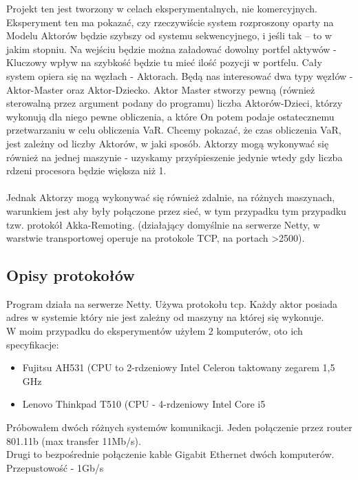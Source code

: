 \documentclass[11pt,titlepage]{article}
\begin{document}
Projekt ten jest tworzony w celach eksperymentalnych, nie komercyjnych. Eksperyment ten ma pokazać, czy rzeczywiście system rozproszony oparty na Modelu Aktorów będzie szybszy od systemu sekwencyjnego, i jeśli tak – to w jakim stopniu. Na wejściu będzie można załadować dowolny portfel aktywów - Kluczowy wpływ na szybkość będzie tu mieć ilość pozycji w portfelu. Cały system opiera się na węzłach - Aktorach. Będą nas interesować dwa typy węzłów - Aktor-Master oraz Aktor-Dziecko. Aktor Master stworzy pewną (również sterowalną przez argument podany do programu) liczba Aktorów-Dzieci, którzy wykonują dla niego pewne obliczenia, a które On potem podaje ostatecznemu przetwarzaniu w celu obliczenia VaR. Chcemy pokazać, że czas obliczenia VaR, jest zależny od liczby Aktorów, w jaki sposób. Aktorzy mogą wykonywać się również na jednej maszynie - uzyskamy przyśpieszenie jedynie wtedy gdy liczba rdzeni procesora będzie większa niż 1.\\
\\
Jednak Aktorzy mogą wykonywać się również zdalnie, na różnych maszynach, warunkiem jest aby były połączone przez sieć, w tym przypadku tym przypadku tzw. protokół Akka-Remoting. (działający domyślnie na serwerze Netty, w warstwie transportowej operuje na protokole TCP, na portach >2500).



\subsection{Opisy protokołów}

Program działa na serwerze Netty. Używa protokołu tcp. Każdy aktor posiada adres w systemie który nie jest zależny od maszyny na której się wykonuje. 
\\
W moim przypadku do eksperymentów użyłem 2 komputerów, oto ich specyfikacje:
\begin{itemize}
  \item Fujitsu AH531 (CPU to 2-rdzeniowy Intel Celeron taktowany zegarem 1,5 GHz
	\item Lenovo Thinkpad  T510 (CPU - 4-rdzeniowy Intel Core i5

\end{itemize}

Próbowałem dwóch różnych systemów komunikacji. Jeden połączenie przez router 801.11b (max transfer 11Mb/s).
\\
Drugi to bezpośrednie połączenie kable Gigabit Ethernet dwóch komputerów. Przepustowość - 1Gb/s
\\
\end{document}
